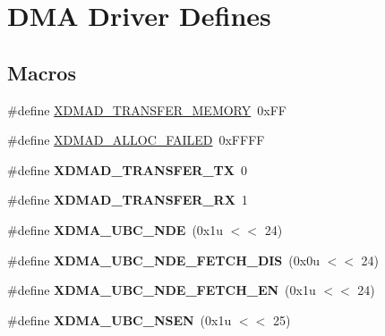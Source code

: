 \hypertarget{group__dmad__defines}{}\section{D\+MA Driver Defines}
\label{group__dmad__defines}
\subsection*{Macros}
\begin{DoxyCompactItemize}
\item 
\#define \mbox{\hyperlink{group__dmad__defines_gaf546b0494f9f0e949bf9bd7a37bbc82c}{X\+D\+M\+A\+D\+\_\+\+T\+R\+A\+N\+S\+F\+E\+R\+\_\+\+M\+E\+M\+O\+RY}}~0x\+FF
\item 
\#define \mbox{\hyperlink{group__dmad__defines_gaaf241aab265afa0d7eb386c81ee42f41}{X\+D\+M\+A\+D\+\_\+\+A\+L\+L\+O\+C\+\_\+\+F\+A\+I\+L\+ED}}~0x\+F\+F\+FF
\item 
\mbox{\label{group__dmad__defines_gae0c5bd72d8695c93ab4758b7981d1cb4}} 
\#define {\bfseries X\+D\+M\+A\+D\+\_\+\+T\+R\+A\+N\+S\+F\+E\+R\+\_\+\+TX}~0
\item 
\mbox{\label{group__dmad__defines_gaa5a052446b501dcb234cfdbdc28818ad}} 
\#define {\bfseries X\+D\+M\+A\+D\+\_\+\+T\+R\+A\+N\+S\+F\+E\+R\+\_\+\+RX}~1
\item 
\mbox{\label{group__dmad__defines_ga8465d644c64f1f514aa4eb03cfdb872b}} 
\#define {\bfseries X\+D\+M\+A\+\_\+\+U\+B\+C\+\_\+\+N\+DE}~(0x1u $<$$<$ 24)
\item 
\mbox{\label{group__dmad__defines_ga4d2f10836a619cd48669df1d27d3b52b}} 
\#define {\bfseries X\+D\+M\+A\+\_\+\+U\+B\+C\+\_\+\+N\+D\+E\+\_\+\+F\+E\+T\+C\+H\+\_\+\+D\+IS}~(0x0u $<$$<$ 24)
\item 
\mbox{\label{group__dmad__defines_gaefbc1853096d793ff61cab57c7ab4fd3}} 
\#define {\bfseries X\+D\+M\+A\+\_\+\+U\+B\+C\+\_\+\+N\+D\+E\+\_\+\+F\+E\+T\+C\+H\+\_\+\+EN}~(0x1u $<$$<$ 24)
\item 
\mbox{\label{group__dmad__defines_gad7049e161d3860dbbc1cb7c4be730e56}} 
\#define {\bfseries X\+D\+M\+A\+\_\+\+U\+B\+C\+\_\+\+N\+S\+EN}~(0x1u $<$$<$ 25)

\end{DoxyCompactItemize}
